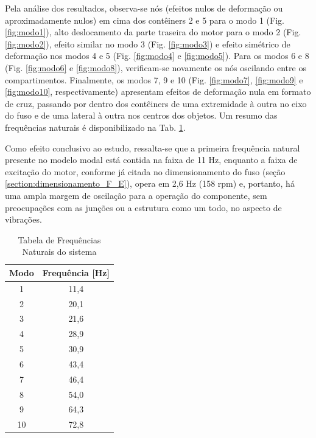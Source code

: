 Pela análise dos resultados, observa-se nós (efeitos nulos de deformação ou aproximadamente nulos) em cima dos contêiners 2 e 5 para o modo 1 (Fig. \ref{fig:modo1}), alto deslocamento da parte traseira do motor para o modo 2 (Fig. \ref{fig:modo2}), efeito similar no modo 3 (Fig. \ref{fig:modo3}) e efeito simétrico de deformação nos modos 4 e 5 (Fig. \ref{fig:modo4} e \ref{fig:modo5}). Para os modos 6 e 8 (Fig. \ref{fig:modo6} e \ref{fig:modo8}), verificam-se novamente os nós oscilando entre os compartimentos. Finalmente, os modos 7, 9 e 10 (Fig. \ref{fig:modo7}, \ref{fig:modo9} e \ref{fig:modo10}, respectivamente) apresentam efeitos de deformação nula em formato de cruz, passando por dentro dos contêiners de uma extremidade à outra no eixo do fuso e de uma lateral à outra nos centros dos objetos.  Um resumo das frequências naturais é disponibilizado na Tab. \ref{tab:modos}. 

Como efeito conclusivo ao estudo, ressalta-se que a primeira frequência natural presente no modelo modal está contida na faixa de 11 Hz, enquanto a faixa de excitação do motor, conforme já citada no dimensionamento do fuso (seção \ref{section:dimensionamento_F_E}), opera em 2,6 Hz (158 rpm) e, portanto, há uma ampla margem de oscilação para a operação do componente, sem preocupações com as junções ou a estrutura como um todo, no aspecto de vibrações. 

\begin{table}[ht]
    \centering
    \footnotesize
    \caption{Tabela de Frequências Naturais do sistema}
    \label{tab:modos}
    \begin{adjustbox}{max width = \textwidth}
        \begin{tabular}{|c|c|}
            \hline
            \rowcolor[HTML]{A8DADC}
            \textbf{Modo} & \textbf{Frequência [Hz]}  \\ \hline
            1 & 11,4 \\ 
            \hline
            2 & 20,1 \\
            \hline
            3 & 21,6 \\
            \hline
            4 & 28,9 \\
            \hline
            5 & 30,9 \\
            \hline
            6 & 43,4 \\
            \hline
            7 & 46,4 \\
            \hline
            8 & 54,0 \\
            \hline
            9 & 64,3 \\
            \hline
            10 & 72,8 \\
            \hline
        \end{tabular}
    \end{adjustbox}
\end{table}


